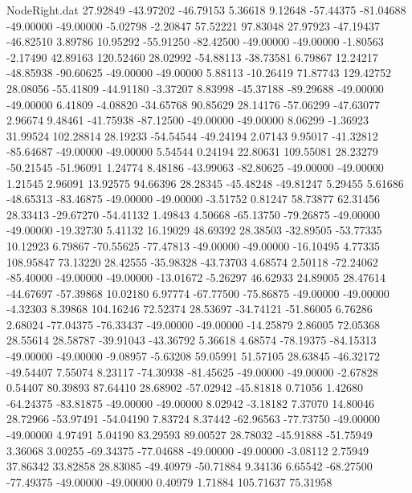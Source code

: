 \begin{filecontents}{NodeRight.dat}
  27.92849  -43.97202  -46.79153     5.36618    9.12648  -57.44375  -81.04688  -49.00000  -49.00000   -5.02798   -2.20847   57.52221   97.83048
  27.97923  -47.19437  -46.82510     3.89786   10.95292  -55.91250  -82.42500  -49.00000  -49.00000   -1.80563   -2.17490   42.89163  120.52460
  28.02992  -54.88113  -38.73581     6.79867   12.24217  -48.85938  -90.60625  -49.00000  -49.00000    5.88113  -10.26419   71.87743  129.42752
  28.08056  -55.41809  -44.91180    -3.37207    8.83998  -45.37188  -89.29688  -49.00000  -49.00000    6.41809   -4.08820  -34.65768   90.85629
  28.14176  -57.06299  -47.63077     2.96674    9.48461  -41.75938  -87.12500  -49.00000  -49.00000    8.06299   -1.36923   31.99524  102.28814
  28.19233  -54.54544  -49.24194     2.07143    9.95017  -41.32812  -85.64687  -49.00000  -49.00000    5.54544    0.24194   22.80631  109.55081
  28.23279  -50.21545  -51.96091     1.24774    8.48186  -43.99063  -82.80625  -49.00000  -49.00000    1.21545    2.96091   13.92575   94.66396
  28.28345  -45.48248  -49.81247     5.29455    5.61686  -48.65313  -83.46875  -49.00000  -49.00000   -3.51752    0.81247   58.73877   62.31456
  28.33413  -29.67270  -54.41132     1.49843    4.50668  -65.13750  -79.26875  -49.00000  -49.00000  -19.32730    5.41132   16.19029   48.69392
  28.38503  -32.89505  -53.77335    10.12923    6.79867  -70.55625  -77.47813  -49.00000  -49.00000  -16.10495    4.77335  108.95847   73.13220
  28.42555  -35.98328  -43.73703     4.68574    2.50118  -72.24062  -85.40000  -49.00000  -49.00000  -13.01672   -5.26297   46.62933   24.89005
  28.47614  -44.67697  -57.39868    10.02180    6.97774  -67.77500  -75.86875  -49.00000  -49.00000   -4.32303    8.39868  104.16246   72.52374
  28.53697  -34.74121  -51.86005     6.76286    2.68024  -77.04375  -76.33437  -49.00000  -49.00000  -14.25879    2.86005   72.05368   28.55614
  28.58787  -39.91043  -43.36792     5.36618    4.68574  -78.19375  -84.15313  -49.00000  -49.00000   -9.08957   -5.63208   59.05991   51.57105
  28.63845  -46.32172  -49.54407     7.55074    8.23117  -74.30938  -81.45625  -49.00000  -49.00000   -2.67828    0.54407   80.39893   87.64410
  28.68902  -57.02942  -45.81818     0.71056    1.42680  -64.24375  -83.81875  -49.00000  -49.00000    8.02942   -3.18182    7.37070   14.80046
  28.72966  -53.97491  -54.04190     7.83724    8.37442  -62.96563  -77.73750  -49.00000  -49.00000    4.97491    5.04190   83.29593   89.00527
  28.78032  -45.91888  -51.75949     3.36068    3.00255  -69.34375  -77.04688  -49.00000  -49.00000   -3.08112    2.75949   37.86342   33.82858
  28.83085  -49.40979  -50.71884     9.34136    6.65542  -68.27500  -77.49375  -49.00000  -49.00000    0.40979    1.71884  105.71637   75.31958

\end{filecontents}
